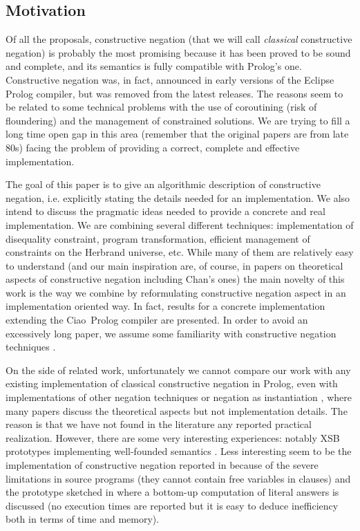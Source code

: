 \documentclass{tlp}
\newcommand{\ciao}{Ciao}
\begin{document}
\subsection{Motivation}

Of all the proposals, constructive negation \cite{Chan1,Chan2} (that
we will call \emph{classical} constructive negation) is probably the
most promising because it has been proved to be sound and complete,
and its semantics is fully compatible with Prolog's one. Constructive
negation was, in fact, announced in early versions of the Eclipse
Prolog compiler, but was removed from the latest releases.  The
reasons seem to be related to some technical problems with the use of
coroutining (risk of floundering) and the management of constrained
solutions. We are trying to fill a long time open gap in this area
(remember that the original papers are from late 80s) facing the
problem of providing a correct, complete and effective implementation.

The goal of this paper is to give an algorithmic description of
constructive negation, i.e. explicitly stating the details needed for
an implementation. We also intend to discuss the pragmatic ideas
needed to provide a concrete and real implementation.  We are
combining several different techniques: implementation of disequality
constraint, program transformation, efficient management of
constraints on the Herbrand universe, etc. While many of them are
relatively easy to understand (and our main inspiration are, of
course, in papers on theoretical aspects of constructive negation
including Chan's ones) the main novelty of this work is the way we
combine by reformulating constructive negation aspect in an
implementation oriented way.  In fact, results for a concrete
implementation extending the \ciao\ Prolog compiler are presented.
In order to avoid an excessively long paper, we assume some familiarity with constructive
negation techniques \cite{Chan1,Chan2}.

On the side of related work, unfortunately we cannot compare our work
with any existing implementation of classical constructive negation in
Prolog, even with implementations of other negation techniques %
or negation as instantiation \cite{DiPierro}, where many papers discuss
the theoretical aspects but not implementation details. The reason is that we
have not found in the literature any reported practical
realization. However, there are some very interesting experiences:
notably XSB prototypes implementing well-founded semantics
\cite{Alferes95}. Less interesting seem to be the implementation of
constructive negation reported in \cite{Bartak} because of the severe
limitations in source programs (they cannot contain free variables in
clauses) and the prototype sketched in \cite{BNC-cneg} where a
bottom-up computation of literal answers is discussed (no execution
times are reported but it is easy to deduce inefficiency both in terms
of time and memory).
\end{document}
